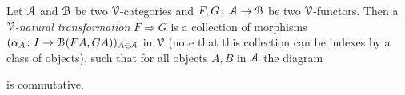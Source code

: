 \documentclass[a4paper,11pt,oneside,openany]{scrbook}
\begin{document}
\begin{defn}
	Let $\A$ and $\B$ be two $\V$-categories and $F,G \from \A \to \B$ be two $\V$-functors. Then a $\V$\emph{-natural transformation} $F \Rightarrow G$ is a
	collection of morphisms $(\alpha_{A} \from I \to \B(FA,GA))_{A \in \A}$ in $\V$ (note that this collection can be indexes by a class of objects), such that for
	all objects $A,B$ in $\A$ the diagram
	\begin{center}
	\end{center}
	is commutative.


\end{defn}
\end{document}
